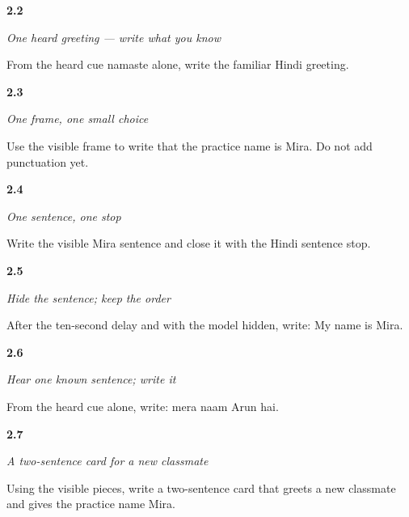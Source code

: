 \noindent\begin{minipage}[t]{\linewidth}
\raggedright
\hypertarget{review-HI-W05-namaste-dictation-answer}{\textbf{2.2}} \emph{One heard greeting — write what you know}\par
\small From the heard cue namaste alone, write the familiar Hindi greeting.
\end{minipage}\par\medskip

\noindent\begin{minipage}[t]{\linewidth}
\raggedright
\hypertarget{review-HI-W06-name-sentence-frame-check}{\textbf{2.3}} \emph{One frame, one small choice}\par
\small Use the visible frame to write that the practice name is Mira. Do not add punctuation yet.
\end{minipage}\par\medskip

\noindent\begin{minipage}[t]{\linewidth}
\raggedright
\hypertarget{review-HI-W06-name-sentence-stop-check}{\textbf{2.4}} \emph{One sentence, one stop}\par
\small Write the visible Mira sentence and close it with the Hindi sentence stop.
\end{minipage}\par\medskip

\noindent\begin{minipage}[t]{\linewidth}
\raggedright
\hypertarget{review-HI-W06-name-sentence-delayed-check}{\textbf{2.5}} \emph{Hide the sentence; keep the order}\par
\small After the ten-second delay and with the model hidden, write: My name is Mira.
\end{minipage}\par\medskip

\noindent\begin{minipage}[t]{\linewidth}
\raggedright
\hypertarget{review-HI-W06-name-sentence-dictation-check}{\textbf{2.6}} \emph{Hear one known sentence; write it}\par
\small From the heard cue alone, write: mera naam Arun hai.
\end{minipage}\par\medskip

\noindent\begin{minipage}[t]{\linewidth}
\raggedright
\hypertarget{review-HI-W06-two-sentence-card-check}{\textbf{2.7}} \emph{A two-sentence card for a new classmate}\par
\small Using the visible pieces, write a two-sentence card that greets a new classmate and gives the practice name Mira.
\end{minipage}\par\medskip

